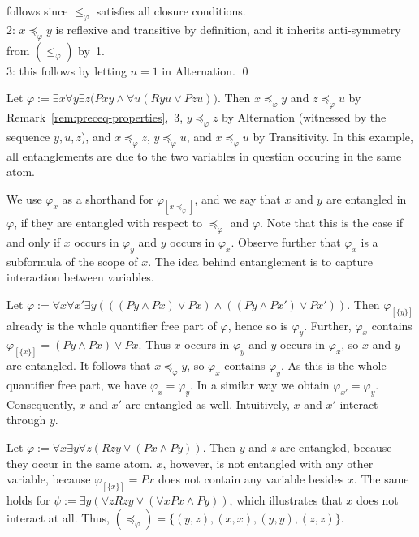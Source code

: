\documentclass{LMCS}
\renewcommand{\phi}{\varphi}
\newcommand{\alt}{Alternation}
\begin{document}
 follows since $\leq_{\phi}$ satisfies all closure conditions. \\
2: $x\preceq_{\phi}y$ is reflexive and transitive by definition, 
and it inherits anti-symmetry from $(\leq_{\phi})$ by~1. \\
3: this follows by letting $n=1$ in \alt{}.
\qed

\begin{exa}\label{ex:preceq}
Let $\phi:=\exists x\forall y \exists z \big(Pxy\wedge\forall u(Ryu\vee Pzu)\big)$.
Then $x\preceq_{\phi}y$ and $z\preceq_{\phi}u$
by Remark~\ref{rem:preceq-properties},~3, 
$y\preceq_{\phi}z$ by Alternation (witnessed by the sequence $y,u,z$), 
and $x\preceq_{\phi}z$, $y\preceq_{\phi}u$, and $x\preceq_{\phi}u$ 
by Transitivity.
In this example, all entanglements are due to 
the two variables in question occuring in the same atom. 
\end{exa}

We use $\phi_x$ as a shorthand for $\phi_{[x\preceq_{\phi}]}$, 
and we say that $x$ and $y$ are entangled in $\phi$, 
if they are entangled with respect to $\preceq_{\phi}$ and $\phi$. 
Note that this is the case 
if and only if $x$ occurs in $\phi_y$ and $y$ occurs in $\phi_x$. 
Observe further that $\phi_x$ is a subformula of the scope of $x$. 
The idea behind entanglement is to capture interaction between variables. 

\begin{exa}\label{exa:entanglement}
Let $\phi:=\forall x\forall x'\exists y
  (((Py\wedge Px)\vee Px) \wedge ((Py\wedge Px')\vee Px'))$. 
Then $\phi_{[\{y\}]}$ already is the whole quantifier free part of $\phi$, 
hence so is $\phi_y$. 
Further, $\phi_x$ contains $\phi_{[\{x\}]}=(Py\wedge Px)\vee Px$. 
Thus $x$ occurs in $\phi_y$ and $y$ occurs in $\phi_x$, 
so $x$ and $y$ are entangled. 
It follows that $x\preceq_{\phi}y$, so $\phi_x$ contains $\phi_y$. 
As this is the whole quantifier free part, we have $\phi_x=\phi_y$. 
In a similar way we obtain $\phi_{x'}=\phi_y$. 
Consequently, $x$ and $x'$ are entangled as well. 
Intuitively, $x$ and $x'$ interact through $y$. 
\end{exa}

\begin{exa}\label{exa:non-entanglement}
Let $\phi:=\forall x\exists y\forall z(Rzy\vee(Px\wedge Py))$. 
Then $y$ and $z$ are entangled, because they occur in the same atom. 
$x$, however, is not entangled with any other variable, 
because $\phi_{[\{x\}]}=Px$ does not contain any variable besides $x$. 
The same holds for $\psi:=\exists y(\forall zRzy\vee(\forall xPx\wedge Py))$, 
which illustrates that $x$ does not interact at all. 
Thus, $(\preceq_{\phi})=\{(y,z),(x,x),(y,y),(z,z)\}$. 
\end{exa}
\end{document}

